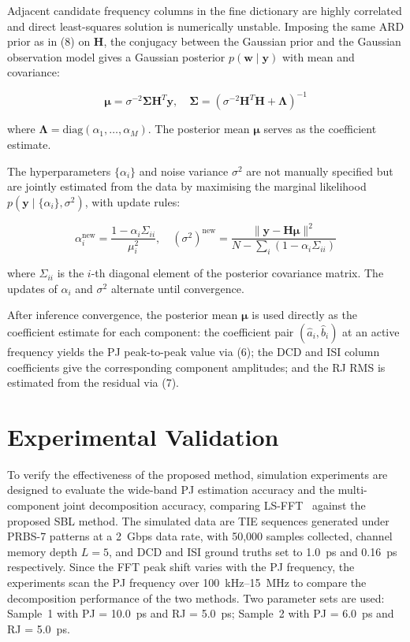 \documentclass[10pt, a4paper, twocolumn]{article}
\begin{document}
Adjacent candidate frequency columns in the fine dictionary are highly correlated and direct least-squares solution is numerically unstable. Imposing the same ARD prior as in (8) on $\mathbf{H}$, the conjugacy between the Gaussian prior and the Gaussian observation model gives a Gaussian posterior $p(\mathbf{w} \mid \mathbf{y})$ with mean and covariance:

\begin{equation}
\boldsymbol{\mu} = \sigma^{-2}\boldsymbol{\Sigma}\mathbf{H}^T\mathbf{y}, \quad \boldsymbol{\Sigma} = \left(\sigma^{-2}\mathbf{H}^T\mathbf{H} + \boldsymbol{\Lambda}\right)^{-1} \tag{12}
\end{equation}

where $\boldsymbol{\Lambda} = \mathrm{diag}(\alpha_1, \ldots, \alpha_M)$. The posterior mean $\boldsymbol{\mu}$ serves as the coefficient estimate.

The hyperparameters $\{\alpha_i\}$ and noise variance $\sigma^2$ are not manually specified but are jointly estimated from the data by maximising the marginal likelihood $p(\mathbf{y} \mid \{\alpha_i\}, \sigma^2)$, with update rules:

\begin{equation}
\alpha_i^{\mathrm{new}} = \frac{1 - \alpha_i \Sigma_{ii}}{\mu_i^2}, \quad (\sigma^2)^{\mathrm{new}} = \frac{\|\mathbf{y} - \mathbf{H}\boldsymbol{\mu}\|^2}{N - \sum_i(1 - \alpha_i\Sigma_{ii})} \tag{13}
\end{equation}

where $\Sigma_{ii}$ is the $i$-th diagonal element of the posterior covariance matrix. The updates of $\alpha_i$ and $\sigma^2$ alternate until convergence.

After inference convergence, the posterior mean $\boldsymbol{\mu}$ is used directly as the coefficient estimate for each component: the coefficient pair $(\hat{a}_i, \hat{b}_i)$ at an active frequency yields the PJ peak-to-peak value via (6); the DCD and ISI column coefficients give the corresponding component amplitudes; and the RJ RMS is estimated from the residual via (7).


\section{Experimental Validation}

To verify the effectiveness of the proposed method, simulation experiments are designed to evaluate the wide-band PJ estimation accuracy and the multi-component joint decomposition accuracy, comparing LS-FFT~\cite{duan_fast_2019} against the proposed SBL method. The simulated data are TIE sequences generated under PRBS-7 patterns at a 2~Gbps data rate, with 50{,}000 samples collected, channel memory depth $L=5$, and DCD and ISI ground truths set to 1.0~ps and 0.16~ps respectively. Since the FFT peak shift varies with the PJ frequency, the experiments scan the PJ frequency over 100~kHz--15~MHz to compare the decomposition performance of the two methods. Two parameter sets are used: Sample~1 with PJ = 10.0~ps and RJ = 5.0~ps; Sample~2 with PJ = 6.0~ps and RJ = 5.0~ps.
\end{document}
